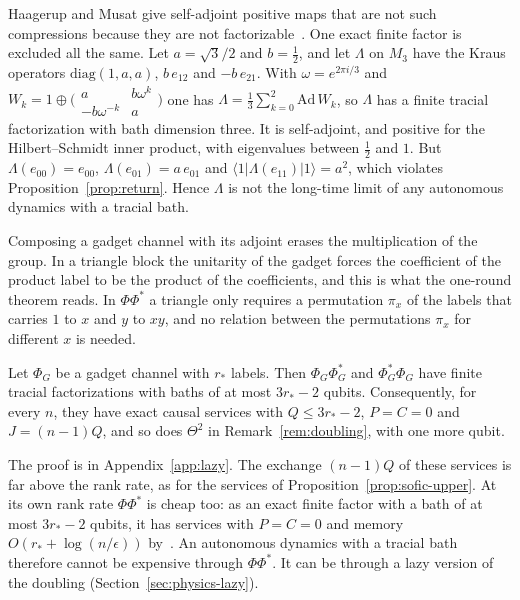 \begin{remark}\label{rem:qutrit}
Haagerup and Musat give self-adjoint positive maps that are not such compressions because they are not
factorizable~\cite[Theorem~5.4]{HaagerupMusat2011}. One exact finite factor is excluded all the same. Let $a=\sqrt3/2$ and $b=\frac12$, and let
$\Lambda$ on $M_3$ have the Kraus operators $\mathrm{diag}(1,a,a)$, $b\,e_{12}$ and $-b\,e_{21}$. With
$\omega=e^{2\pi i/3}$ and $W_k=1\oplus\bigl(\begin{smallmatrix}a&b\omega^k\\-b\omega^{-k}&a\end{smallmatrix}\bigr)$ one has
$\Lambda=\frac13\sum_{k=0}^2\mathrm{Ad}\,W_k$, so $\Lambda$ has a finite tracial factorization with bath dimension three. It is self-adjoint, and positive
for the Hilbert--Schmidt inner product, with eigenvalues between $\frac12$ and $1$. But $\Lambda(e_{00})=e_{00}$, $\Lambda(e_{01})=a\,e_{01}$ and
$\langle1|\Lambda(e_{11})|1\rangle=a^2$, which violates Proposition~\ref{prop:return}. Hence $\Lambda$ is not the long-time limit of any autonomous
dynamics with a tracial bath.
\end{remark}

Composing a gadget channel with its adjoint erases the multiplication of the group. In a triangle block the unitarity of the gadget forces the
coefficient of the product label to be the product of the coefficients, and this is what the one-round theorem reads. In $\Phi\Phi^*$ a triangle only
requires a permutation $\pi_x$ of the labels that carries $1$ to $x$ and $y$ to $xy$, and no relation between the permutations $\pi_x$ for
different $x$ is needed.

\begin{proposition}\label{prop:compositions}
Let $\Phi_G$ be a gadget channel with $r_*$ labels. Then $\Phi_G\Phi_G^*$ and $\Phi_G^*\Phi_G$ have finite tracial factorizations with baths of at
most $3r_*-2$ qubits. Consequently, for every $n$, they have exact causal services with $Q\le3r_*-2$, $P=C=0$ and $J=(n-1)Q$, and so does
$\Theta^2$ in Remark~\ref{rem:doubling}, with one more qubit.
\end{proposition}

The proof is in Appendix~\ref{app:lazy}. The exchange $(n-1)Q$ of these services is far above the rank rate, as for the services of
Proposition~\ref{prop:sofic-upper}. At its own rank rate $\Phi\Phi^*$ is cheap too: as an exact finite factor with a bath of at most $3r_*-2$
qubits, it has services with $P=C=0$ and memory $O(r_*+\log(n/\epsilon))$ by~\cite[Theorem~8.6]{DouglasMghirbiB}. An autonomous dynamics with a tracial bath therefore cannot be expensive through $\Phi\Phi^*$. It can be through a lazy version
of the doubling (Section~\ref{sec:physics-lazy}).
